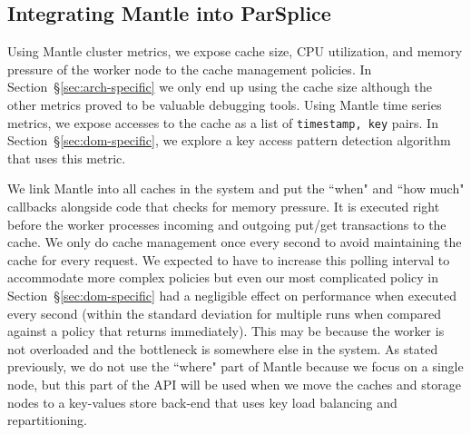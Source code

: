 \subsection{Integrating Mantle into ParSplice}

Using Mantle cluster metrics, we expose cache size, CPU utilization, and memory
pressure of the worker node to the cache management policies. In
Section~\S\ref{sec:arch-specific} we only end up using the cache size although
the other metrics proved to be valuable debugging tools. Using Mantle time
series metrics, we expose accesses to the cache as a list of \texttt{timestamp,
key} pairs. In Section~\S\ref{sec:dom-specific}, we explore a key access
pattern detection algorithm that uses this metric.

We link Mantle into all caches in the system and put the ``when" and ``how
much" callbacks alongside code that checks for memory pressure. It is executed
right before the worker processes incoming and outgoing put/get transactions to
the cache. We only do cache management once every second to avoid maintaining
the cache for every request. We expected to have to increase this polling
interval to accommodate more complex policies but even our most complicated
policy in Section~\S\ref{sec:dom-specific} had a negligible effect on
performance when executed every second (within the standard deviation for
multiple runs when compared against a policy that returns immediately). This
may be because the worker is not overloaded and the bottleneck is somewhere
else in the system.  As stated previously, we do not use the ``where" part of
Mantle because we focus on a single node, but this part of the API will be used
when we move the caches and storage nodes to a key-values store back-end that
uses key load balancing and repartitioning.

